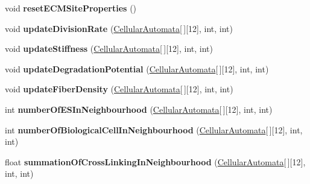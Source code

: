 \begin{DoxyCompactItemize}
\item 
\hypertarget{class_cellular_automata_a4dc2d77173fbd4416b631003025ee23a}{}void {\bfseries reset\+E\+C\+M\+Site\+Properties} ()\label{class_cellular_automata_a4dc2d77173fbd4416b631003025ee23a}

\item 
\hypertarget{class_cellular_automata_a5539246e49c3fad85e762ec7c204ac55}{}void {\bfseries update\+Division\+Rate} (\hyperlink{class_cellular_automata}{Cellular\+Automata}\mbox{[}$\,$\mbox{]}\mbox{[}12\mbox{]}, int, int)\label{class_cellular_automata_a5539246e49c3fad85e762ec7c204ac55}

\item 
\hypertarget{class_cellular_automata_ae74e2b4008bb317e726e981d33c5d2d3}{}void {\bfseries update\+Stiffness} (\hyperlink{class_cellular_automata}{Cellular\+Automata}\mbox{[}$\,$\mbox{]}\mbox{[}12\mbox{]}, int, int)\label{class_cellular_automata_ae74e2b4008bb317e726e981d33c5d2d3}

\item 
\hypertarget{class_cellular_automata_a9eb5092afb7f4cc7b7b17b2f7bbf4dea}{}void {\bfseries update\+Degradation\+Potential} (\hyperlink{class_cellular_automata}{Cellular\+Automata}\mbox{[}$\,$\mbox{]}\mbox{[}12\mbox{]}, int, int)\label{class_cellular_automata_a9eb5092afb7f4cc7b7b17b2f7bbf4dea}

\item 
\hypertarget{class_cellular_automata_a742b0f3e99913f023fde880110f50fac}{}void {\bfseries update\+Fiber\+Density} (\hyperlink{class_cellular_automata}{Cellular\+Automata}\mbox{[}$\,$\mbox{]}\mbox{[}12\mbox{]}, int, int)\label{class_cellular_automata_a742b0f3e99913f023fde880110f50fac}

\item 
\hypertarget{class_cellular_automata_a6b7fb94d2729d82507b5ab2dc3563db8}{}int {\bfseries number\+Of\+E\+S\+In\+Neighbourhood} (\hyperlink{class_cellular_automata}{Cellular\+Automata}\mbox{[}$\,$\mbox{]}\mbox{[}12\mbox{]}, int, int)\label{class_cellular_automata_a6b7fb94d2729d82507b5ab2dc3563db8}

\item 
\hypertarget{class_cellular_automata_a9124de8cadc1a1b88fee664e81a04a49}{}int {\bfseries number\+Of\+Biological\+Cell\+In\+Neighbourhood} (\hyperlink{class_cellular_automata}{Cellular\+Automata}\mbox{[}$\,$\mbox{]}\mbox{[}12\mbox{]}, int, int)\label{class_cellular_automata_a9124de8cadc1a1b88fee664e81a04a49}

\item 
\hypertarget{class_cellular_automata_a51f9b7ce4b342e4b107986066f679fb5}{}float {\bfseries summation\+Of\+Cross\+Linking\+In\+Neighbourhood} (\hyperlink{class_cellular_automata}{Cellular\+Automata}\mbox{[}$\,$\mbox{]}\mbox{[}12\mbox{]}, int, int)\label{class_cellular_automata_a51f9b7ce4b342e4b107986066f679fb5}


\end{DoxyCompactItemize}
